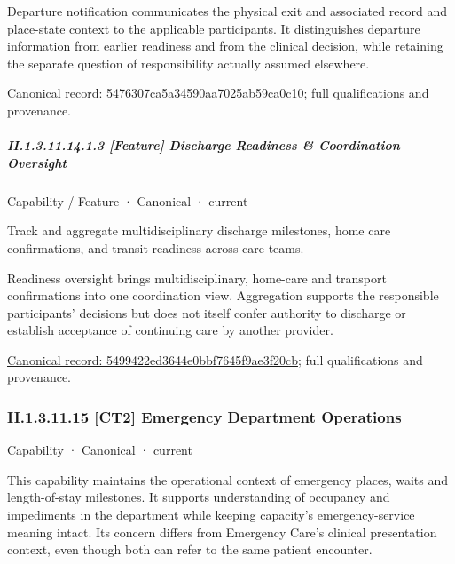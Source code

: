 Departure notification communicates the physical exit and associated record and place-state context to the applicable participants. It distinguishes departure information from earlier readiness and from the clinical decision, while retaining the separate question of responsibility actually assumed elsewhere.


{\footnotesize \href{../../../../continuum/strategy/capability/feature/5476307ca5a34590aa7025ab59ca0c10.md}{Canonical record: 5476307ca5a34590aa7025ab59ca0c10}; full qualifications and provenance.}\par
\subparagraph*{II.1.3.11.14.1.3 [Feature] Discharge Readiness \& Coordination Oversight}
\label{navigation:II.1.3.11.14.1.3}

\label{element:5499422ed3644e0bbf7645f9ae3f20cb}
{\small Capability / Feature · Canonical · current}\par

Track and aggregate multidisciplinary discharge milestones, home care confirmations, and transit readiness across care teams.



Readiness oversight brings multidisciplinary, home-care and transport confirmations into one coordination view. Aggregation supports the responsible participants' decisions but does not itself confer authority to discharge or establish acceptance of continuing care by another provider.


{\footnotesize \href{../../../../continuum/strategy/capability/feature/5499422ed3644e0bbf7645f9ae3f20cb.md}{Canonical record: 5499422ed3644e0bbf7645f9ae3f20cb}; full qualifications and provenance.}\par
\subsubsection*{II.1.3.11.15 [CT2] Emergency Department Operations}
\label{navigation:II.1.3.11.15}

\label{element:24a4b5815faa4d369bc756a6e97d3e9e}
{\small Capability · Canonical · current}\par

This capability maintains the operational context of emergency places, waits and length-of-stay milestones. It supports understanding of occupancy and impediments in the department while keeping capacity's emergency-service meaning intact. Its concern differs from Emergency Care's clinical presentation context, even though both can refer to the same patient encounter.



